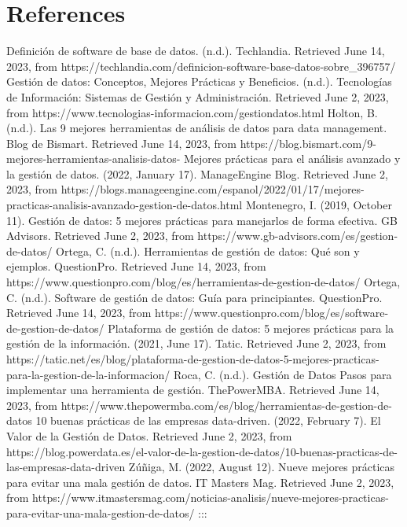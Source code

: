 \documentclass[
  letterpaper,
  DIV=11,
  numbers=noendperiod]{scrreprt}
\begin{document}

\hypertarget{references-1}{%
\chapter*{References}\label{references-1}}


Definición de software de base de datos. (n.d.). Techlandia. Retrieved
June 14, 2023, from
https://techlandia.com/definicion-software-base-datos-sobre\_396757/
Gestión de datos: Conceptos, Mejores Prácticas y Beneficios. (n.d.).
Tecnologías de Información: Sistemas de Gestión y Administración.
Retrieved June 2, 2023, from
https://www.tecnologias-informacion.com/gestiondatos.html Holton, B.
(n.d.). Las 9 mejores herramientas de análisis de datos para data
management. Blog de Bismart. Retrieved June 14, 2023, from
https://blog.bismart.com/9-mejores-herramientas-analisis-datos- Mejores
prácticas para el análisis avanzado y la gestión de datos. (2022,
January 17). ManageEngine Blog. Retrieved June 2, 2023, from
https://blogs.manageengine.com/espanol/2022/01/17/mejores-practicas-analisis-avanzado-gestion-de-datos.html
Montenegro, I. (2019, October 11). Gestión de datos: 5 mejores prácticas
para manejarlos de forma efectiva. GB Advisors. Retrieved June 2, 2023,
from https://www.gb-advisors.com/es/gestion-de-datos/ Ortega, C. (n.d.).
Herramientas de gestión de datos: Qué son y ejemplos. QuestionPro.
Retrieved June 14, 2023, from
https://www.questionpro.com/blog/es/herramientas-de-gestion-de-datos/
Ortega, C. (n.d.). Software de gestión de datos: Guía para
principiantes. QuestionPro. Retrieved June 14, 2023, from
https://www.questionpro.com/blog/es/software-de-gestion-de-datos/
Plataforma de gestión de datos: 5 mejores prácticas para la gestión de
la información. (2021, June 17). Tatic. Retrieved June 2, 2023, from
https://tatic.net/es/blog/plataforma-de-gestion-de-datos-5-mejores-practicas-para-la-gestion-de-la-informacion/
Roca, C. (n.d.). Gestión de Datos \textbar{} Pasos para implementar una
herramienta de gestión. ThePowerMBA. Retrieved June 14, 2023, from
https://www.thepowermba.com/es/blog/herramientas-de-gestion-de-datos 10
buenas prácticas de las empresas data-driven. (2022, February 7). El
Valor de la Gestión de Datos. Retrieved June 2, 2023, from
https://blog.powerdata.es/el-valor-de-la-gestion-de-datos/10-buenas-practicas-de-las-empresas-data-driven
Zúñiga, M. (2022, August 12). Nueve mejores prácticas para evitar una
mala gestión de datos. IT Masters Mag. Retrieved June 2, 2023, from
https://www.itmastersmag.com/noticias-analisis/nueve-mejores-practicas-para-evitar-una-mala-gestion-de-datos/
:::
\end{document}

